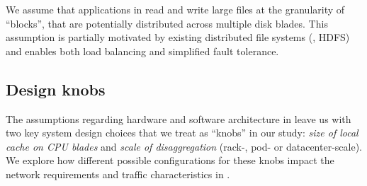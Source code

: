 We assume that applications in \dis read and write large files at the granularity of ``blocks'', that are potentially distributed across multiple disk blades. This assumption is partially motivated by existing distributed file systems (\eg, HDFS) and enables both load balancing and simplified fault tolerance. %

\vspace{-0.1in}
\subsection{Design knobs}
\vspace{-0.05in}
\label{ssec:knobs}
The assumptions regarding hardware and software architecture in \dis leave us with two key system design choices that we treat as ``knobs'' in our study: {\em size of local cache on CPU blades} and {\em scale of disaggregation} (rack-, pod- or datacenter-scale). We explore how different possible configurations for these knobs impact the network requirements and traffic characteristics in \dis.




